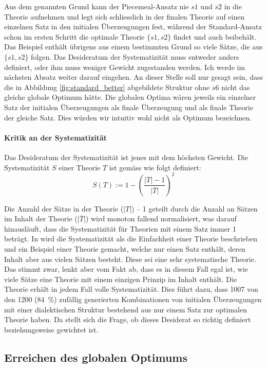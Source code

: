 \documentclass{article}
\begin{document}
Aus dem genannten Grund kann der Piecemeal-Ansatz nie $s1$ und $s2$ in die Theorie aufnehmen und legt sich schliesslich in der finalen Theorie auf einen einzelnen Satz in den initialen Überzeugungen fest, während der Standard-Ansatz schon im ersten Schritt die optimale Theorie $\{s1, s2\}$ findet und auch beibehält. Das Beispiel enthält übrigens aus einem bestimmten Grund so viele Sätze, die aus $\{s1, s2\}$ folgen. Das Desideratum der Systematizität muss entweder anders definiert, oder ihm muss weniger Gewicht zugestanden werden. Ich werde im nächsten Absatz weiter darauf eingehen. An dieser Stelle soll nur gesagt sein, dass die in Abbildung \ref{fig:standard_better} abgebildete Struktur ohne $s6$ nicht das gleiche globale Optimum hätte. Die globalen Optima wären jeweils ein einzelner Satz der initialen Überzeugungen als finale Überzeugung und als finale Theorie der gleiche Satz. Dies würden wir intuitiv wohl nicht als Optimum bezeichnen.

\paragraph{Kritik an der Systematizität}
Das Desideratum der Systematizität ist jenes mit dem höchsten Gewicht. Die Systematizität $S$ einer Theorie $T$ ist gemäss \cite[S. 465]{beisbart_making_2021} wie folgt definiert:
$$
S(T) := 1- \left(\frac{\lvert T \rvert -1}{\lvert \overline{T} \rvert}\right)^2
$$

Die Anzahl der Sätze in der Theorie ($\lvert T \rvert$) -- 1 geteilt durch die Anzahl an Sätzen im Inhalt der Theorie ($\lvert \overline{T} \rvert$) wird monoton fallend normalisiert, was darauf hinausläuft, dass die Systematizität für Theorien mit einem Satz immer 1 beträgt. In \cite[S.~447]{beisbart_making_2021} wird die Systematizität als die Einfachheit einer Theorie beschrieben und ein Beispiel einer Theorie gemacht, welche nur einen Satz enthält, deren Inhalt aber aus vielen Sätzen besteht. Diese sei eine sehr systematische Theorie. Das stimmt zwar, lenkt aber vom Fakt ab, dass es in diesem Fall egal ist, wie viele Sätze eine Theorie mit einem einzigen Prinzip im Inhalt enthält. Die Theorie erhält in jedem Fall volle Systematizität. Dies führt dazu, dass 1007 von den 1200 (84~\%) zufällig generierten Kombinationen von initialen Überzeugungen mit einer dialektischen Struktur bestehend aus nur einem Satz zur optimalen Theorie haben. Da stellt sich die Frage, ob dieses Desiderat so richtig definiert beziehungsweise gewichtet ist.

\subsection{Erreichen des globalen Optimums}
\end{document}
